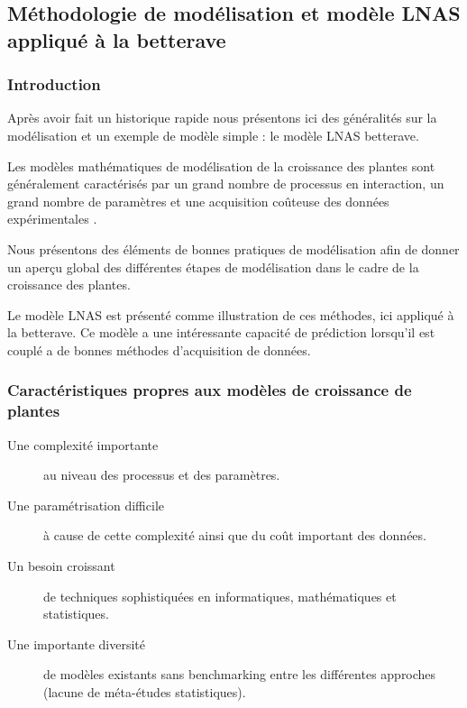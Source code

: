 \subsection[Méthodologie de modélisation et modèle LNAS betterave]{Méthodologie de modélisation et modèle LNAS appliqué à la betterave}

\subsubsection{Introduction}

Après avoir fait un historique rapide nous présentons ici des généralités sur la modélisation et un exemple de modèle simple : le modèle LNAS betterave.

Les modèles mathématiques de modélisation de la croissance des plantes sont généralement caractérisés par un grand nombre de processus en interaction,  un grand nombre de paramètres et une acquisition coûteuse des données expérimentales \cite{article_intro_generale}.

Nous présentons des éléments de bonnes pratiques de modélisation afin de donner un aperçu global des différentes étapes de modélisation dans le cadre de la croissance des plantes.

Le modèle LNAS est présenté comme illustration de ces méthodes, ici appliqué à la betterave. Ce modèle a une intéressante capacité de prédiction lorsqu’il est couplé a de bonnes méthodes d’acquisition de données.

\subsubsection{Caractéristiques propres aux modèles de croissance de plantes}

\begin{description}

\item[Une complexité importante] au niveau des processus et des paramètres.
\item[Une paramétrisation difficile] à cause de cette complexité ainsi que du coût important des données.
\item[Un besoin croissant] de techniques sophistiquées en informatiques, mathématiques et statistiques.
\item[Une importante diversité] de modèles existants sans benchmarking entre les différentes approches (lacune de méta-études statistiques).

\end{description}

